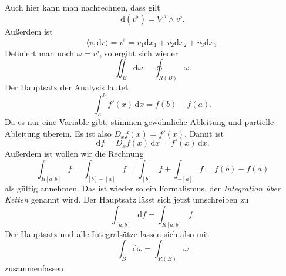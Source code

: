 \documentclass[a4paper,11pt,fleqn,twocolumn,twoside]{scrartcl}
\numberwithin{equation}{section}
\begin{document}
Auch hier kann man nachrechnen, dass gilt
\begin{equation}
\mathrm d(v^\flat) = \nabla^\flat\wedge v^\flat.
\end{equation}
Außerdem ist
\begin{equation}
\langle v,\mathrm dr\rangle = v^\flat
= v_1\mathrm dx_1+v_2\mathrm dx_2+v_3\mathrm dx_3.
\end{equation}
Definiert man noch $\omega = v^\flat$, so ergibt sich wieder
\begin{equation}
\iint_B \mathrm d\omega = \oint_{R(B)}\omega.
\end{equation}
%
Der Hauptsatz der Analysis lautet
\begin{equation}
\int_a^b f'(x)\,\mathrm dx = f(b)-f(a).
\end{equation}
Da es nur eine Variable gibt, stimmen gewöhnliche Ableitung und
partielle Ableitung überein. Es ist also $D_x f(x) = f'(x)$.
%
Damit ist
\begin{equation}
\mathrm df = D_x f(x)\,\mathrm dx = f'(x)\,\mathrm dx.
\end{equation}
%
Außerdem ist wollen wir die Rechnung
\begin{equation}
\int_{R[a,b]} f = \int_{[b]-[a]}f = \int_{[b]} f + \int_{-[a]} f
= f(b)-f(a)
\end{equation}
als gültig annehmen. Das ist wieder so ein Formalismus, der
\textit{Integration über Ketten} genannt wird.
%
Der Hauptsatz lässt sich jetzt umschreiben zu
\begin{equation}
\int_{[a,b]} \mathrm df = \int_{R[a,b]}f.
\end{equation}
Der Hauptsatz und alle Integralsätze lassen sich also mit
\begin{equation}
\int_B \mathrm d\omega = \int_{R(B)}\omega
\end{equation}
zusammenfassen.
\end{document}
